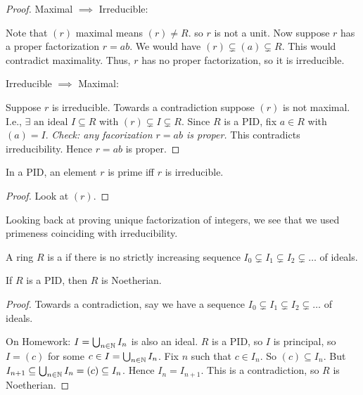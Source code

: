 \documentclass[notes.tex]{subfiles}
\begin{document}
\begin{proof}
	Maximal $\implies$ Irreducible:

	Note that $(r)$ maximal means $(r)\ne R$. so $r$ is not a unit.
	Now suppose $r$ has a proper factorization $r = ab$. We would have $(r)\subsetneq(a)\subsetneq R$. This would contradict maximality. Thus, $r$ has no proper factorization, so it is irreducible.

	Irreducible $\implies$ Maximal:

	Suppose $r$ is irreducible. Towards a contradiction suppose $(r)$ is not maximal. I.e., $\exists \text{ an ideal } I\subseteq R$ with $(r) \subsetneq I \subsetneq R$. Since $R$ is a PID, fix $a\in R$ with $(a) = I$. \emph{Check: any facorization $r = ab$ is proper.}
	This contradicts irreducibility. Hence $r = ab$ is proper.
\end{proof}

\begin{corollary}
	In a PID, an element $r$ is prime iff $r$ is irreducible.
\end{corollary}
\begin{proof}
	Look at $(r)$.
\end{proof}

Looking back at proving unique factorization of integers, we see that we used primeness coinciding with irreducibility.

\begin{defn}
	A ring $R$ is a  if there is no strictly increasing sequence  $I_0\subsetneq I_1\subsetneq I_2\subsetneq \ldots$ of ideals.
\end{defn}

\begin{proposition}
	If $R$ is a PID, then $R$ is Noetherian.
\end{proposition}
\begin{proof}
	Towards a contradiction, say we have a sequence $I_0\subsetneq I_1\subsetneq I_2\subsetneq \ldots$ of ideals.

	On Homework: $I = \bigcup_{n\in\mathbb{N}}I_n$ is also an ideal. $R$ is a PID, so $I$ is principal, so $I = (c)$ for some $c\in I = \bigcup_{n\in\mathbb{N}}I_n$. Fix $n$ such that $c\in I_n$. So $(c) \subseteq I_n$. But $I_{n+1} \subseteq \bigcup_{n\in\mathbb{N}}I_n = (c) \subseteq I_n$. Hence $I_n = I_{n+1}$. This is a contradiction, so $R$ is Noetherian.
\end{proof}
\end{document}
